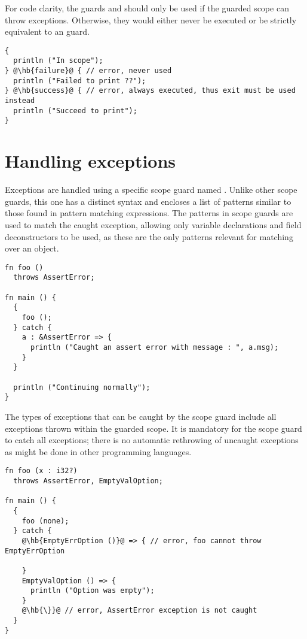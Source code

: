 For code clarity, the guards  and  should only be
used if the guarded scope can throw exceptions. Otherwise, they would either
never be executed or be strictly equivalent to an  guard.

\begin{lstlisting}[style=coloredverbatim, escapechar=@]
{
  println ("In scope");
} @\hb{failure}@ { // error, never used
  println ("Failed to print ??");
} @\hb{success}@ { // error, always executed, thus exit must be used instead
  println ("Succeed to print");
}
\end{lstlisting}

\vfill%
\pagebreak

\section{Handling exceptions}
\label{sec:catching_errors}

Exceptions are handled using a specific scope guard named . Unlike
other scope guards, this one has a distinct syntax and encloses a list of
patterns similar to those found in pattern matching expressions. The patterns in
 scope guards are used to match the caught exception, allowing only
variable declarations and field deconstructors to be used, as these are the only
patterns relevant for matching over an object.


\begin{lstlisting}[style=coloredverbatim]
fn foo ()
  throws AssertError;

fn main () {
  {
    foo ();
  } catch {
    a : &AssertError => {
      println ("Caught an assert error with message : ", a.msg);
    }
  }

  println ("Continuing normally");
}
\end{lstlisting}

The types of exceptions that can be caught by the  scope guard
include all exceptions thrown within the guarded scope. It is mandatory for the
scope guard to catch all exceptions; there is no automatic rethrowing of
uncaught exceptions as might be done in other programming languages.

\begin{lstlisting}[style=coloredverbatim, escapechar=@]
fn foo (x : i32?)
  throws AssertError, EmptyValOption;

fn main () {
  {
    foo (none);
  } catch {
    @\hb{EmptyErrOption ()}@ => { // error, foo cannot throw EmptyErrOption

    }
    EmptyValOption () => {
      println ("Option was empty");
    }
    @\hb{\}}@ // error, AssertError exception is not caught
  }
}
\end{lstlisting}

